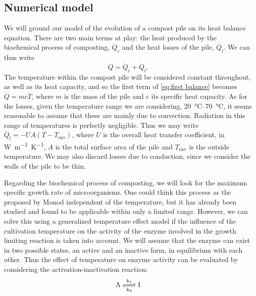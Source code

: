 \documentclass[12pt, a4paper, twocolumn]{article}
\numberwithin{table}{section}
\numberwithin{figure}{section}
\numberwithin{equation}{section}
\begin{document}
\subsection{Numerical model}
We will ground our model of the evolution of a compost pile on its heat balance equation. There are two main terms at play: the heat produced by the biochemical process of composting, \( \dot{Q}_c \) and the heat losses of the pile, \( \dot{Q}_l \). We can thus write
\begin{equation} \label{eq:first balance}
	\dot{Q} = \dot{Q}_c + \dot{Q}_l. 
\end{equation}
The temperature within the compost pile will be considered constant throughout, as well as its heat capacity, and so the first term of \cref{eq:first balance} becomes \( \dot{Q} = mc\dot{T} \), where \( m \) is the mass of the pile and \( c \) its specific heat capacity. As for the losses, given the temperature range we are considering, \SIrange{20}{70}{\celsius}, it seems reasonable to assume that these are mainly due to convection. Radiation in this range of temperatures is perfectly negligible. Thus we may write \( \dot{Q}_l = -UA\left(T - T_\text{env}\right) \), where \( U \) is the overall heat transfer coefficient, in \si{W.m^{-1}.K^{-1}}, \( A \) is the total surface area of the pile and \( T_\text{env} \) is the outside temperature. We may also discard losses due to conduction, since we consider the walls of the pile to be thin.

Regarding the biochemical process of composting, we will look for the maximum specific growth rate of microorganisms. One could think this process as the proposed by Monod independent of the temperature, but it has already been studied and found to be applicable within only a limited range. However, we can solve this using a generalized temperature effect model if the influence of the cultivation temperature on the activity of the enzyme involved in the growth limiting reaction is taken into account\cite{85bio}. We will assume that the enzyme can exist in two possible states, an active and an inactive form, in equilibrium with each other\cite{biokinetics}. Thus the effect of temperature on enzyme activity can be evaluated by considering the activation-inactivation reaction:
\begin{equation}
    \ce{A <=>[\ce{k1}][\ce{k2}] I}
\end{equation}
\end{document}
